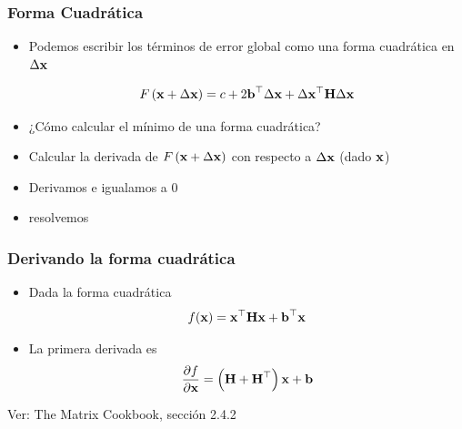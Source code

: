 \begin{frame}
    \frametitle{Forma Cuadrática}
    
    \begin{itemize}
        \item<1-> Podemos escribir los términos de error global como una forma cuadrática en $\Delta \boldsymbol{\mathbf{x}}$
        
        \begin{equation*}
            F\left(\boldsymbol{\mathbf{x}} + \Delta \boldsymbol{\mathbf{x}} \right) = c + 2 \boldsymbol{\mathbf{b}}^{\top} \Delta \boldsymbol{\mathbf{x}} + \Delta \boldsymbol{\mathbf{x}}^{\top} \boldsymbol{\mathbf{H}} \Delta \boldsymbol{\mathbf{x}}
        \end{equation*}
        
        \item<1> \alert{¿Cómo calcular el mínimo de una forma cuadrática?}
        \item<2-> Calcular la derivada de  $F\left(\boldsymbol{\mathbf{x}} + \Delta \boldsymbol{\mathbf{x}} \right)$ con respecto a $\Delta \boldsymbol{\mathbf{x}}$ (dado $\boldsymbol{\mathbf{x}}$)
        \item<2-> Derivamos e igualamos a 0
        \item<2-> resolvemos
    \end{itemize}

\end{frame}

\begin{frame}
    \frametitle{Derivando la forma cuadrática}
    
    \begin{itemize}
        \item Dada la forma cuadrática
        \begin{equation*}
            f(\boldsymbol{\mathbf{x}}) = \boldsymbol{\mathbf{x}}^{\top} \boldsymbol{\mathbf{H}} \boldsymbol{\mathbf{x}} + \boldsymbol{\mathbf{b}}^{\top} \boldsymbol{\mathbf{x}}
        \end{equation*}
        \item La primera derivada es
        \begin{equation*}
            \dfrac{\partial f}{\partial \boldsymbol{\mathbf{x}}} = \left( \boldsymbol{\mathbf{H}} + \boldsymbol{\mathbf{H}}^{\top} \right) \boldsymbol{\mathbf{x}} + \boldsymbol{\mathbf{b}}
        \end{equation*}
    \end{itemize}
    
    Ver: The Matrix Cookbook, sección 2.4.2
   
\end{frame}

